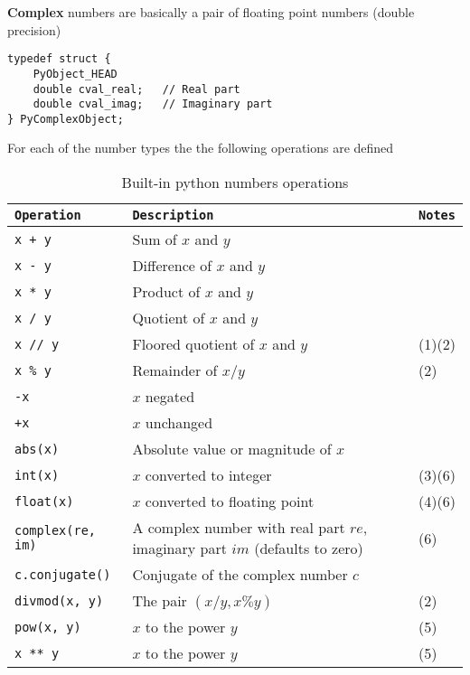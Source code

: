 \documentclass[10pt, openany]{article}
\begin{document}
  \textbf{Complex} numbers are basically a pair of floating point 
  numbers (double precision)
  \begin{lstlisting}
typedef struct {
    PyObject_HEAD
    double cval_real;   // Real part
    double cval_imag;   // Imaginary part
} PyComplexObject;
  \end{lstlisting}
  For each of the number types the the following operations 
  are defined
  \begin{table}[ht]
    \centering
    \caption{Built-in python numbers operations}
    \begin{tabular}{@{}lll@{}}
        \toprule
        \texttt{Operation}         & \texttt{Description}                                  & \texttt{Notes}           \\ \midrule
        \texttt{x + y}        & Sum of \(x\) and \(y\)                            &                  \\
        \texttt{x - y}        & Difference of \(x\) and \(y\)                     &                  \\
        \texttt{x * y}        & Product of \(x\) and \(y\)                        &                  \\
        \texttt{x / y}        & Quotient of \(x\) and \(y\)                       &                  \\
        \texttt{x // y}       & Floored quotient of \(x\) and \(y\)               & (1)(2)          \\
        \texttt{x \% y}       & Remainder of \(x / y\)                            & (2)              \\
        \texttt{-x}           & \(x\) negated                                      &                  \\
        \texttt{+x}           & \(x\) unchanged                                    &                  \\
        \texttt{abs(x)}       & Absolute value or magnitude of \(x\)               &                  \\
        \texttt{int(x)}       & \(x\) converted to integer                          & (3)(6)          \\
        \texttt{float(x)}     & \(x\) converted to floating point                   & (4)(6)          \\
        \texttt{complex(re, im)} & A complex number with real part \(re\), imaginary part \(im\) (defaults to zero) & (6) \\
        \texttt{c.conjugate()} & Conjugate of the complex number \(c\)              &                  \\
        \texttt{divmod(x, y)} & The pair \((x / y, x \% y)\)                     & (2)              \\
        \texttt{pow(x, y)}    & \(x\) to the power \(y\)                           & (5)              \\
        \texttt{x ** y}       & \(x\) to the power \(y\)                           & (5)              \\ 
        \bottomrule
    \end{tabular}
    \label{tab:math_operations}
  \end{table}
\end{document}
